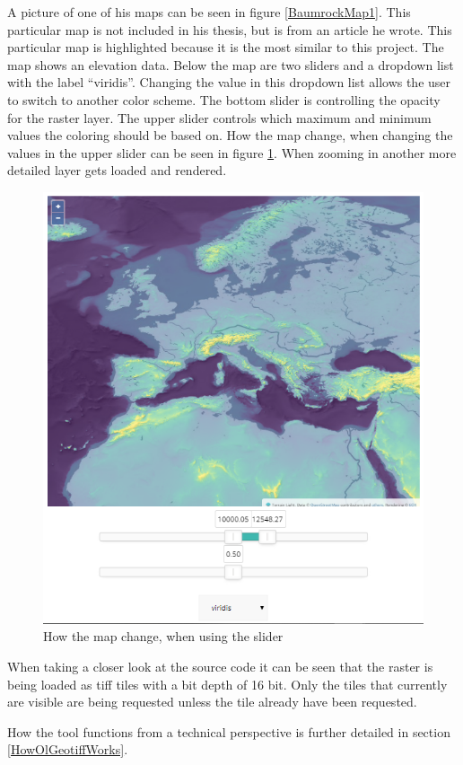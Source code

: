 A picture of one of his maps can be seen in figure \ref{BaumrockMap1}. This particular map is not included in his thesis, but is from an article he wrote. \citep{EOX}
This particular map is highlighted because it is the most similar to this project. The map shows an elevation data. Below the map are two sliders and a dropdown list with the label “viridis”. Changing the value in this dropdown list allows the user to switch to another color scheme. The bottom slider is controlling the opacity for the raster layer. The upper slider controls which maximum and minimum values the coloring should be based on. How the map change, when changing the values in the upper slider can be seen in figure \ref{BaumrockMap2}. When zooming in another more detailed layer gets loaded and rendered.
\begin{figure} [H]
	\centering
	\includegraphics[width=.6\textwidth]{Pictures/BaumrockMap2}
	\caption{How the map change, when using the slider}
	\label{BaumrockMap2}
\end{figure}

When taking a closer look at the source code it can be seen that the raster is being loaded as tiff tiles with a bit depth of 16 bit. \citep{EOX} Only the tiles that currently are visible are being requested unless the tile already have been requested. \citep{Baumrocks}

How the tool functions from a technical perspective is further detailed in section \ref{HowOlGeotiffWorks}.
